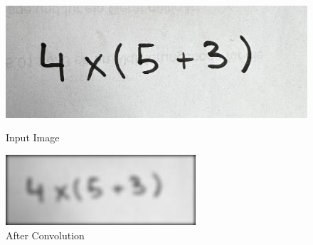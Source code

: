 \documentclass[@CLASSOPTIONS@]{tumarticle}
\begin{document}
\begin{figure}[!htb]
    \vspace{0.3cm}
   \begin{minipage}{0.48\textwidth}
     \centering
     \includegraphics[width=.7\linewidth]{figures/real_data_1}
     \caption{Input Image}\label{Fig:Data3}
   \end{minipage}\hfill
   \vspace{0.3cm}
   \begin{minipage}{0.48\textwidth}
     \centering
     \includegraphics[width=.7\linewidth]{figures/convolve}
     \caption{After Convolution}\label{Fig:Data4_1}
   \end{minipage}
      \vspace{0.3cm}


\end{figure}
\end{document}

